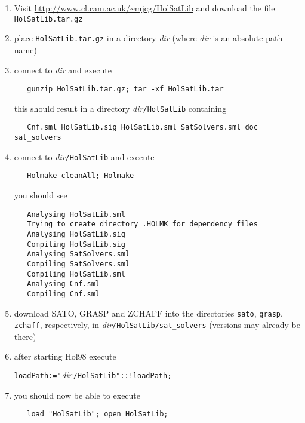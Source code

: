 \documentclass[12pt]{article}
\newcommand\Hol{Hol98\xspace}
\begin{document}
\begin{enumerate}

\item Visit \url{http://www.cl.cam.ac.uk/~mjcg/HolSatLib} and
download the file {\tt HolSatLib.tar.gz}

\item place  {\tt HolSatLib.tar.gz} in a directory {\it dir}
(where {\it dir} is an absolute path name)

\item connect to {\it dir} and execute\\[-9mm]
{\small\begin{verbatim}
   gunzip HolSatLib.tar.gz; tar -xf HolSatLib.tar
\end{verbatim}}
\vspace*{-4mm}
this should result in a directory {\it dir}{\tt/HolSatLib} containing
\vspace*{-4mm}
{\small\begin{verbatim}
   Cnf.sml HolSatLib.sig HolSatLib.sml SatSolvers.sml doc sat_solvers
\end{verbatim}}

\item connect to {\it dir}{\tt/HolSatLib} and execute\\[-9mm]
{\small\begin{verbatim}
   Holmake cleanAll; Holmake
\end{verbatim}}
\vspace*{-4mm}
you should see
\vspace*{-4mm}
{\small\begin{verbatim}
   Analysing HolSatLib.sml
   Trying to create directory .HOLMK for dependency files
   Analysing HolSatLib.sig
   Compiling HolSatLib.sig
   Analysing SatSolvers.sml
   Compiling SatSolvers.sml
   Compiling HolSatLib.sml
   Analysing Cnf.sml
   Compiling Cnf.sml
\end{verbatim}}

\item download SATO, GRASP and ZCHAFF into the directories {\tt sato}, {\tt grasp},
{\tt zchaff}, respectively, in {\it dir}{\tt/HolSatLib/sat\_solvers}
(versions may already be there)

\item after starting \Hol execute\\[-9mm]
{\small\begin{alltt}
   loadPath := "\({\it{dir}}\)/HolSatLib" :: !loadPath;
\end{alltt}}

\item you should now be able to execute\\[-9mm]
{\small\begin{verbatim}
   load "HolSatLib"; open HolSatLib;
\end{verbatim}}
\end{enumerate}
\end{document}
